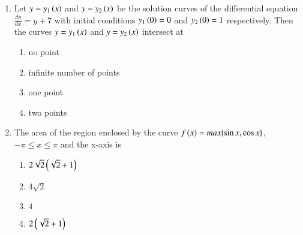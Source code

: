 \documentclass[journal]{IEEEtran}
\begin{document}
\begin{enumerate}
\item Let $y=y_1\left(x\right)$ and $y=y_2\left(x\right)$ be the solution curves of the differential equation $\frac{dy}{dx} = y+7$ with initial conditions $y_1\left(0\right) = 0$ and $y_2\left(0\right) = 1$ respectively. Then the curves $y=y_1\left(x\right)$ and $y=y_2\left(x\right)$ intersect at
\begin{multicols}{2}
    \begin{enumerate}
        \item no point
        \item infinite number of points
        \item one point
        \item two points
    \end{enumerate}
\end{multicols}

\item The area of the region enclosed by the curve $f\left(x\right) = max\{\sin{x}, \cos{x}\}$, $-\pi\leq x \leq\pi$ and the x-axis is
\begin{multicols}{2}
    \begin{enumerate}
        \item $2\sqrt{2}\left(\sqrt{2}+1\right)$
        \item $4\sqrt{2}$
        \item $4$
        \item $2\left(\sqrt{2}+1\right)$
    \end{enumerate}
\end{multicols}
\end{enumerate}
\end{document}
